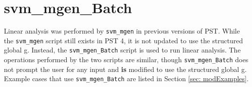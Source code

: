 \pagebreak
\section{svm\_mgen\_Batch}

Linear analysis was performed by \verb|svm_mgen| in previous versions of PST.
While the \verb|svm_mgen| script still exists in PST 4, it is not updated to use the structured global g.
Instead, the \verb|svm_mgen_Batch| script is used to run linear analysis.
The operations performed by the two scripts are similar, though \verb|svm_mgen_Batch| does not prompt the user for any input and \textbf{is} modified to use the structured global g.
Example cases that use \verb|svm_mgen_Batch| are listed in Section \ref{sec: modExamples}.